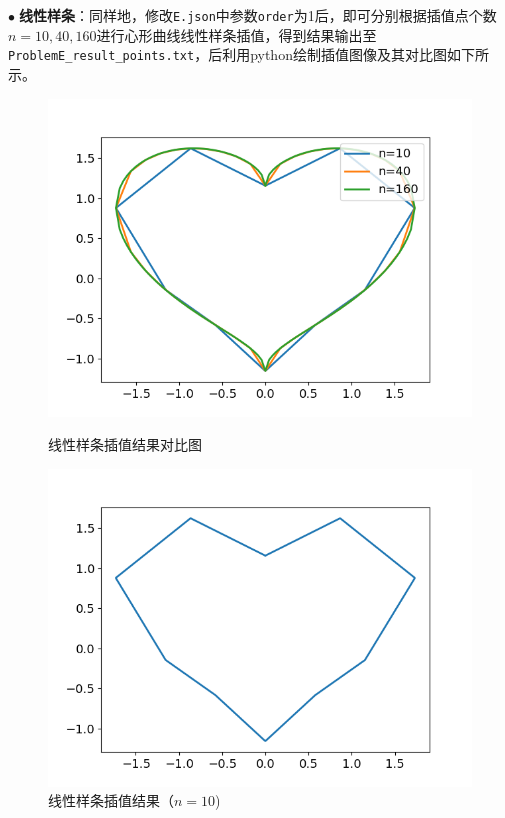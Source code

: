\documentclass{ctexart}
\begin{document}
\begin{sloppypar}
$\bullet \;$\textbf{线性样条}：同样地，修改\verb|E.json|中参数\verb|order|为1后，即可分别根据插值点个数$n=10,40,160$进行心形曲线线性样条插值，得到结果输出至\verb|ProblemE_result_points.txt|，后利用python绘制插值图像及其对比图如下所示。
\begin{figure}[H]
  \begin{minipage}[t]{0.5\linewidth}
    \centering
    \includegraphics[scale = 0.45]{fig//ProblemE_heartplotx3_linear.png}
    \caption{线性样条插值结果对比图}
  \end{minipage}
  \begin{minipage}[t]{0.5\linewidth}
    \centering
    \includegraphics[scale = 0.45]{fig//ProblemE_heartplot_10_linear.png}
    \caption{线性样条插值结果（$n=10$)}

\end{minipage}
\end{figure}
\end{sloppypar}
\end{document}
